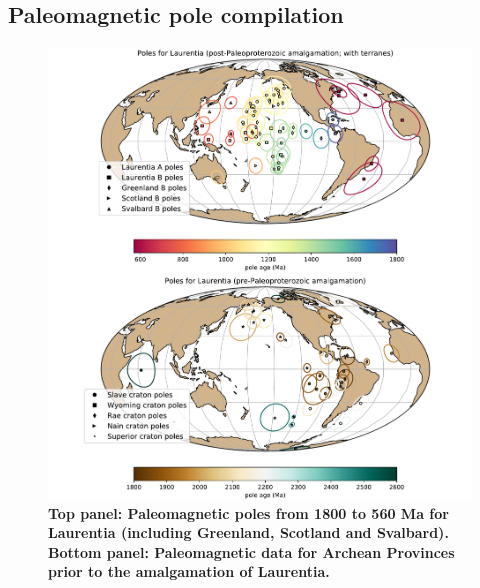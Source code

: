 \documentclass[11pt,letterpaper]{article}
\begin{document}
\subsection{Paleomagnetic pole compilation}

\begin{figure}
\centering
\includegraphics[width=\textwidth]{../Figures/Laurentia_poles_combined.pdf}
\caption{\small{\textbf{Top panel: Paleomagnetic poles from 1800 to 560 Ma for Laurentia (including Greenland, Scotland and Svalbard). Bottom panel: Paleomagnetic data for Archean Provinces prior to the amalgamation of Laurentia.}}}
\label{fig:Laurentia_poles}
\end{figure} 
\end{document}
